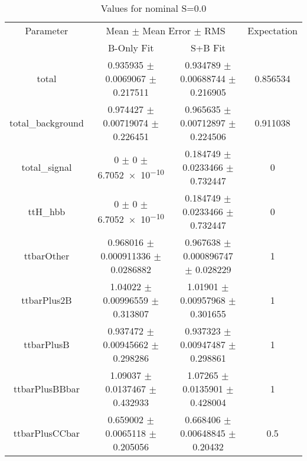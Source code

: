 \begin{table}
\centering
\caption{Values for nominal S=0.0}
\begin{tabular}{cccc}
\toprule
Parameter & \multicolumn{2}{c}{Mean $\pm$ Mean Error $\pm$ RMS} & Expectation\\
 & B-Only Fit & S+B Fit & \\
\midrule
total & \num{0.935935} $\pm$ \num{0.0069067} $\pm$ \num{0.217511} & \num{0.934789} $\pm$ \num{0.00688744} $\pm$ \num{0.216905} & \num{0.856534}\\
total\_background & \num{0.974427} $\pm$ \num{0.00719074} $\pm$ \num{0.226451} & \num{0.965635} $\pm$ \num{0.00712897} $\pm$ \num{0.224506} & \num{0.911038}\\
total\_signal & \num{0} $\pm$ \num{0} $\pm$ \num{6.7052e-10} & \num{0.184749} $\pm$ \num{0.0233466} $\pm$ \num{0.732447} & \num{0}\\
ttH\_hbb & \num{0} $\pm$ \num{0} $\pm$ \num{6.7052e-10} & \num{0.184749} $\pm$ \num{0.0233466} $\pm$ \num{0.732447} & \num{0}\\
ttbarOther & \num{0.968016} $\pm$ \num{0.000911336} $\pm$ \num{0.0286882} & \num{0.967638} $\pm$ \num{0.000896747} $\pm$ \num{0.028229} & \num{1}\\
ttbarPlus2B & \num{1.04022} $\pm$ \num{0.00996559} $\pm$ \num{0.313807} & \num{1.01901} $\pm$ \num{0.00957968} $\pm$ \num{0.301655} & \num{1}\\
ttbarPlusB & \num{0.937472} $\pm$ \num{0.00945662} $\pm$ \num{0.298286} & \num{0.937323} $\pm$ \num{0.00947487} $\pm$ \num{0.298861} & \num{1}\\
ttbarPlusBBbar & \num{1.09037} $\pm$ \num{0.0137467} $\pm$ \num{0.432933} & \num{1.07265} $\pm$ \num{0.0135901} $\pm$ \num{0.428004} & \num{1}\\
ttbarPlusCCbar & \num{0.659002} $\pm$ \num{0.0065118} $\pm$ \num{0.205056} & \num{0.668406} $\pm$ \num{0.00648845} $\pm$ \num{0.20432} & \num{0.5}\\
\bottomrule
\end{tabular}
\end{table}
